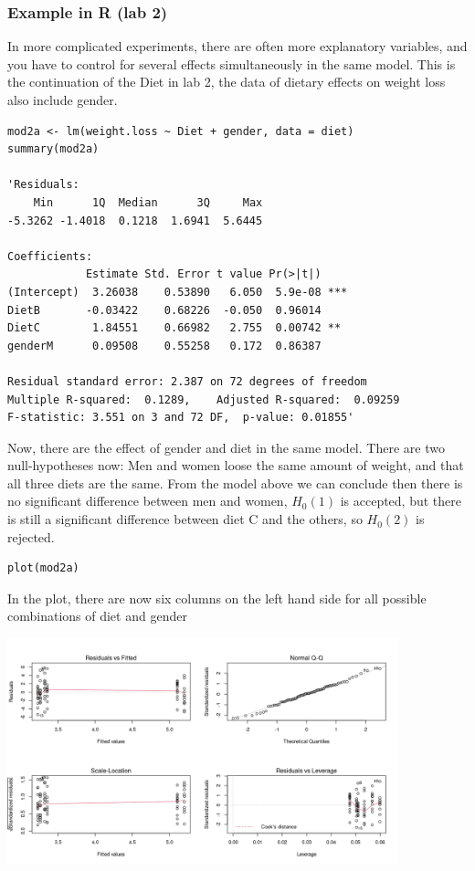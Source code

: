 \documentclass{article}
\begin{document}
\subsubsection{Example in R (lab 2)}
In more complicated experiments, there are often more explanatory variables, and you have to control for several effects simultaneously in the same model. This is the continuation of the Diet in lab 2, the data of dietary effects on weight loss also include gender.\par

\begin{lstlisting}
mod2a <- lm(weight.loss ~ Diet + gender, data = diet)
summary(mod2a)

'Residuals:
    Min      1Q  Median      3Q     Max 
-5.3262 -1.4018  0.1218  1.6941  5.6445 

Coefficients:
            Estimate Std. Error t value Pr(>|t|)    
(Intercept)  3.26038    0.53890   6.050  5.9e-08 ***
DietB       -0.03422    0.68226  -0.050  0.96014    
DietC        1.84551    0.66982   2.755  0.00742 ** 
genderM      0.09508    0.55258   0.172  0.86387    

Residual standard error: 2.387 on 72 degrees of freedom
Multiple R-squared:  0.1289,	Adjusted R-squared:  0.09259 
F-statistic: 3.551 on 3 and 72 DF,  p-value: 0.01855'
\end{lstlisting}
Now, there are the effect of gender and diet in the same model. There are two null-hypotheses now: Men and women loose the same amount of weight, and that all three diets are the same. From the model above we can conclude then there is no significant difference between men and women, $H_0(1)$ is accepted, but there is still a significant difference between diet C and the others, so $H_0(2)$ is rejected.\par
\begin{lstlisting}
plot(mod2a)
\end{lstlisting}
In the plot, there are now six columns on the left hand side for all possible combinations of diet and gender
\begin{center}
\includegraphics[width = 0.85\textwidth]{lab3/lm_1.png}
\end{center}
\end{document}
